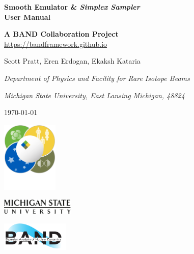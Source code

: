 \documentclass[12pt]{article}
\numberwithin{equation}{section}
\numberwithin{figure}{section}
\begin{document}
\begin{titlepage}
   \begin{center}
       \vspace*{1cm}

       {\bf\LARGE Smooth Emulator \& {\it Simplex Sampler}\\User Manual}

       {\bf A BAND Collaboration Project}\\
       \href{https://bandframework.github.io}{https://bandframework.github.io}

       \vspace{2.0cm}

       {\large Scott Pratt, Eren Erdogan, Ekaksh Kataria}

       {\it Department of Physics and Facility for Rare Isotope Beams}

       {\it Michigan State University, East Lansing Michigan, 48824}

       \today
  \end{center}
       
    \vspace*{1.0in}
     
       \hspace*{1.0in}\includegraphics[width=0.2\textwidth]{FRIB_logo.png}

       \vspace*{-1.3in}
       \hspace*{2.63in}\includegraphics[width=0.26\textwidth]{msu_logo}

       \vspace*{-0.7in}
       \hspace*{4.6in}
       \includegraphics[width=0.24\textwidth]{BAND_logo.png}
            

\end{titlepage}
\end{document}
